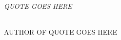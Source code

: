 \thispagestyle{empty}
\vspace*{\fill}

\begin{flushright}
\large {\em QUOTE GOES HERE }\\

\ \

\normalsize
{AUTHOR OF QUOTE GOES HERE}  
\end{flushright}


\vspace*{\fill}
\vspace*{\fill}


\vspace*{\fill}

\vspace*{\fill}

\vspace*{\fill}

